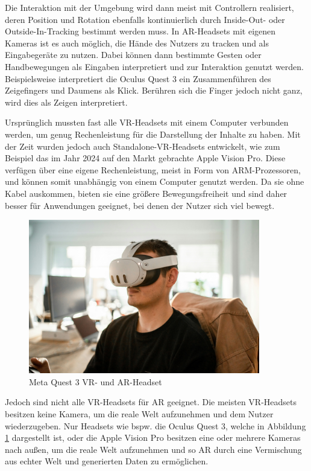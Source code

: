     Die Interaktion mit der Umgebung wird dann meist mit Controllern realisiert, deren Position und Rotation ebenfalls kontinuierlich durch Inside-Out- oder Outside-In-Tracking bestimmt werden muss.
    In AR-Headsets mit eigenen Kameras ist es auch möglich, die Hände des Nutzers zu tracken und als Eingabegeräte zu nutzen.
    Dabei können dann bestimmte Gesten oder Handbewegungen als Eingaben interpretiert und zur Interaktion genutzt werden.
    Beispielsweise interpretiert die Oculus Quest 3 ein Zusammenführen des Zeigefingers und Daumens als Klick.
    Berühren sich die Finger jedoch nicht ganz, wird dies als Zeigen interpretiert.
    
    
    Ursprünglich mussten fast alle VR-Headsets mit einem Computer verbunden werden, um genug Rechenleistung für die Darstellung der Inhalte zu haben.
    Mit der Zeit wurden jedoch auch Standalone-VR-Headsets entwickelt, wie zum Beispiel das im Jahr 2024 auf den Markt gebrachte Apple Vision Pro.
    Diese verfügen über eine eigene Rechenleistung, meist in Form von ARM-Prozessoren, und können somit unabhängig von einem Computer genutzt werden.
    Da sie ohne Kabel auskommen, bieten sie eine größere Bewegungsfreiheit und sind daher besser für Anwendungen geeignet, bei denen der Nutzer sich viel bewegt.

    \begin{figure}[H]
      \centering
      \includegraphics[width=0.9\textwidth]{images/quest3_example.jpg}
      \caption{Meta Quest 3 VR- und AR-Headset}
      \label{fig:oculus-quest-3}
    \end{figure}

    Jedoch sind nicht alle VR-Headsets für AR geeignet.
    Die meisten VR-Headsets besitzen keine Kamera, um die reale Welt aufzunehmen und dem Nutzer wiederzugeben.
    Nur Headsets wie bspw. die Oculus Quest 3, welche in Abbildung \ref{fig:oculus-quest-3} dargestellt ist, oder die Apple Vision Pro besitzen eine oder mehrere Kameras nach außen, um die reale Welt aufzunehmen und so AR durch eine Vermischung aus echter Welt und generierten Daten zu ermöglichen.
    
